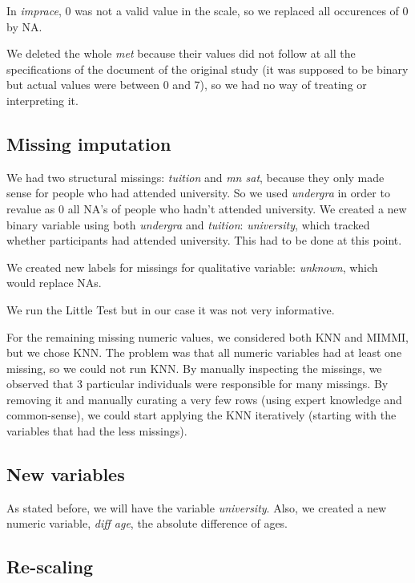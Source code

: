 In \textit{imprace}, 0 was not a valid value in the scale, so we replaced all occurences of 0 by NA.

We deleted the whole \textit{met} because their values did not follow at all the specifications of the document of the original study (it was supposed to be binary but actual values were between 0 and 7), so we had no way of treating or interpreting it.

\subsection{Missing imputation}

We had two structural missings: \textit{tuition} and  \textit{mn sat}, because they only made sense for people who had attended university. So we used \textit{undergra} in order to revalue as 0 all NA's of people who hadn't attended university. We created a new binary variable using both \textit{undergra} and \textit{tuition}: \textit{university}, which tracked whether participants had attended university. This had to be done at this point.

We created new labels for missings for qualitative variable: \textit{unknown}, which would replace NAs.

We run the Little Test but in our case it was not very informative.

For the remaining missing numeric values, we considered both KNN and MIMMI, but we chose KNN. The problem was that all numeric variables had at least one missing, so we could not run KNN. By manually inspecting the missings, we observed that 3 particular individuals were responsible for many missings. By removing it and manually curating a very few rows (using expert knowledge and common-sense), we could start applying the KNN iteratively (starting with the variables that had the less missings).

\subsection{New variables}

As stated before, we will have the variable \textit{university}. Also, we created a new numeric variable, \textit{diff age}, the absolute difference of ages.

\subsection{Re-scaling}

